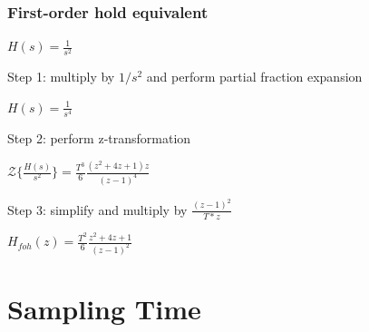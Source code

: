 \begin{frame}
	\frametitle{First-order hold equivalent}
	\begin{example}
		\begin{center}
			$H(s) = \frac{1}{s^{2}}$
		\end{center}
		Step 1: multiply by $1/s^{2}$ and perform partial fraction expansion
		\begin{center}
			$H(s) = \frac{1}{s^{4}}$
		\end{center}
		Step 2: perform z-transformation
		\begin{center}
			$\mathcal{Z}\{\frac{H(s)}{s^{2}}\} = \frac{T^{3}}{6} \frac{(z^{2} + 4z +1) z}{(z-1)^{4}}$
		\end{center}
		Step 3: simplify and multiply by $\frac{(z-1)^{2}}{T*z}$
		\begin{center}
			$H_{foh}(z) = \frac{T^{2}}{6} \frac{z^{2} + 4z + 1}{(z-1)^{2}}$
		\end{center}
	\end{example}
\end{frame}

\section{Sampling Time}

